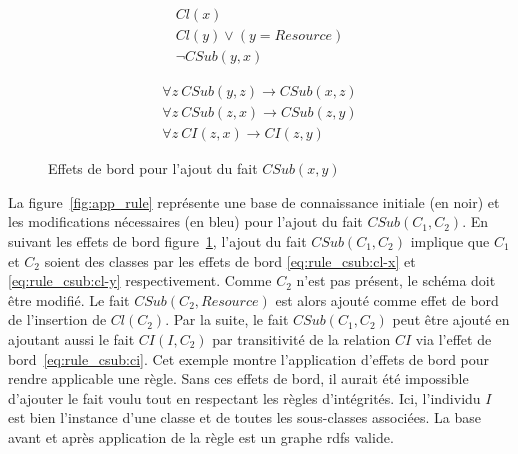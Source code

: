 \begin{figure}[htb]
    \begin{subfigure}{.45\textwidth}
        \begin{align}
            Cl(x) \label{eq:rule_csub:cl-x}\\
            Cl(y) \lor (y = Resource) \label{eq:rule_csub:cl-y}\\
            \neg CSub(y, x) \label{eq:rule_csub:not-csub}
        \end{align}
    \end{subfigure}
    \hfill
    \begin{subfigure}{.4\textwidth}
        \begin{align}
            \forall z ~ CSub(y, z) \to CSub(x, z) \label{eq:rule_csub:csub-bot}\\
            \forall z ~ CSub(z, x) \to CSub(z, y) \label{eq:rule_csub:csub-top}\\
            \forall z ~ CI(z, x) \to CI(z, y) \label{eq:rule_csub:ci}
        \end{align}
    \end{subfigure}
    \caption{Effets de bord pour l'ajout du fait $CSub(x, y)$}
    \label{eq:rule_csub}
\end{figure}

\begin{example}
    La figure~\ref{fig:app_rule} représente une base de connaissance initiale (en noir) et les modifications nécessaires (en bleu) pour l'ajout du fait $CSub(C_1, C_2)$.
    En suivant les effets de bord figure~\ref{eq:rule_csub}, l'ajout du fait $CSub(C_1, C_2)$ implique que $C_1$ et $C_2$ soient des classes par les effets de bord \ref{eq:rule_csub:cl-x} et \ref{eq:rule_csub:cl-y} respectivement.
    Comme $C_2$ n'est pas présent, le schéma doit être modifié.
    Le fait $CSub(C_2, Resource)$ est alors ajouté comme effet de bord de l'insertion de $Cl(C_2)$.
    Par la suite, le fait $CSub(C_1, C_2)$ peut être ajouté en ajoutant aussi le fait $CI(I, C_2)$ par transitivité de la relation $CI$ via l'effet de bord~\ref{eq:rule_csub:ci}.
    Cet exemple montre l'application d'effets de bord pour rendre applicable une règle.
    Sans ces effets de bord, il aurait été impossible d'ajouter le fait voulu tout en respectant les règles d'intégrités.
    Ici, l'individu $I$ est bien l'instance d'une classe et de toutes les sous-classes associées.
    La base avant et après application de la règle est un graphe \gls{rdfs} valide.
\end{example}

